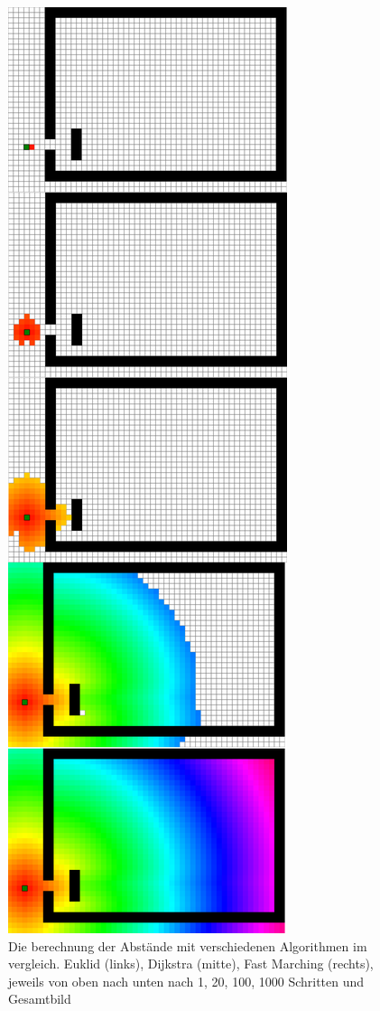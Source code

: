 \begin{figure}
\begin{minipage}{0.32\textwidth}
\end{minipage}
\begin{minipage}{0.32\textwidth}
\centering
  \includegraphics[width=\linewidth]{abbildungen/vergleich_euklid_fast_marching/snapshot_eFastMarching_zusammen_cutted.png}
\end{minipage}
\caption{Die berechnung der Abstände mit verschiedenen Algorithmen im vergleich. Euklid (links), Dijkstra (mitte), Fast Marching (rechts), jeweils von oben nach unten nach 1, 20, 100, 1000 Schritten und Gesamtbild}
\label{fig_euklid_dijkstra_fast_marching_vergleich}
\end{figure}



